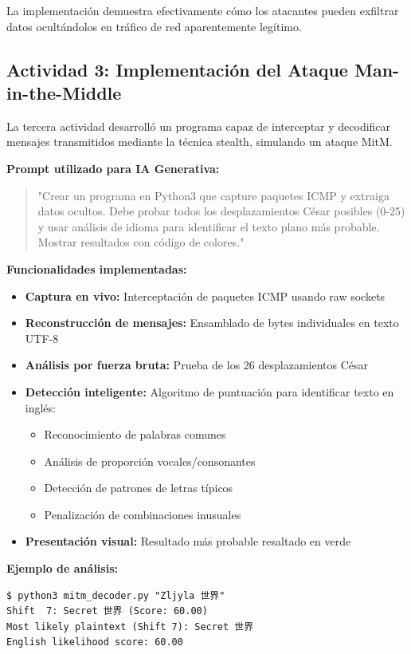 \documentclass[letter,12pt]{article}
\begin{document}
La implementación demuestra efectivamente cómo los atacantes pueden exfiltrar datos ocultándolos en tráfico de red aparentemente legítimo.

\subsection{Actividad 3: Implementación del Ataque Man-in-the-Middle}

La tercera actividad desarrolló un programa capaz de interceptar y decodificar mensajes transmitidos mediante la técnica stealth, simulando un ataque MitM.

\textbf{Prompt utilizado para IA Generativa:}
\begin{quote}
"Crear un programa en Python3 que capture paquetes ICMP y extraiga datos ocultos. Debe probar todos los desplazamientos César posibles (0-25) y usar análisis de idioma para identificar el texto plano más probable. Mostrar resultados con código de colores."
\end{quote}

\textbf{Funcionalidades implementadas:}
\begin{itemize}
    \item \textbf{Captura en vivo:} Interceptación de paquetes ICMP usando raw sockets
    \item \textbf{Reconstrucción de mensajes:} Ensamblado de bytes individuales en texto UTF-8
    \item \textbf{Análisis por fuerza bruta:} Prueba de los 26 desplazamientos César
    \item \textbf{Detección inteligente:} Algoritmo de puntuación para identificar texto en inglés:
    \begin{itemize}
        \item Reconocimiento de palabras comunes
        \item Análisis de proporción vocales/consonantes
        \item Detección de patrones de letras típicos
        \item Penalización de combinaciones inusuales
    \end{itemize}
    \item \textbf{Presentación visual:} Resultado más probable resaltado en verde
\end{itemize}

\textbf{Ejemplo de análisis:}
\begin{verbatim}
$ python3 mitm_decoder.py "Zljyla 世界"
Shift  7: Secret 世界 (Score: 60.00)
Most likely plaintext (Shift 7): Secret 世界
English likelihood score: 60.00
\end{verbatim}
\end{document}
